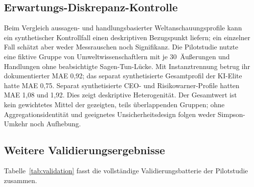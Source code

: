 \documentclass[11pt,a4paper]{article}
\begin{document}
\subsection{Erwartungs-Diskrepanz-Kontrolle}
\label{sec:qa:discrepancy}

Beim Vergleich aussagen- und handlungsbasierter Weltanschauungsprofile kann ein synthetischer Kontrollfall einen deskriptiven Bezugspunkt liefern; ein einzelner Fall schätzt aber weder Messrauschen noch Signifikanz. Die Pilotstudie nutzte eine fiktive Gruppe von Umweltwissenschaftlern mit je 30~Äußerungen und Handlungen ohne beabsichtigte Sagen-Tun-Lücke. Mit Instanztrennung betrug ihr dokumentierter MAE 0,92; das separat synthetisierte Gesamtprofil der KI-Elite hatte MAE 0,75. Separat synthetisierte CEO- und Risikowarner-Profile hatten MAE 1,08 und 1,92. Dies zeigt deskriptive Heterogenität. Der Gesamtwert ist kein gewichtetes Mittel der gezeigten, teils überlappenden Gruppen; ohne Aggregationsidentität und geeignetes Unsicherheitsdesign folgen weder Simpson-Umkehr noch Aufhebung.


\subsection{Weitere Validierungsergebnisse}
\label{sec:qa:additional}

Tabelle~\ref{tab:validation} fasst die vollständige Validierungsbatterie der Pilotstudie zusammen.
\end{document}
